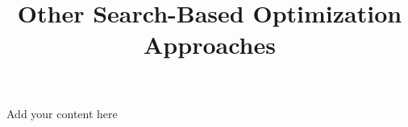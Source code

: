\title{Other Search-Based Optimization Approaches}
\label{chp:other-search-based-optimization-approaches}
\author{}
\institute{}
\maketitle


Add your content here




